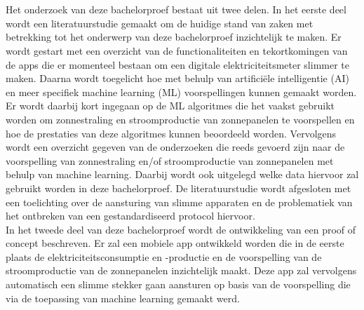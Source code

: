
\chapter{}%
\label{ch:methodologie}


Het onderzoek van deze bachelorproef bestaat uit twee delen. In het eerste deel wordt een literatuurstudie gemaakt om de huidige stand van zaken met betrekking tot het onderwerp van deze bachelorproef inzichtelijk te maken. Er wordt gestart met een overzicht van de functionaliteiten en tekortkomingen van de apps die er momenteel bestaan om een digitale elektriciteitsmeter slimmer te maken. Daarna wordt toegelicht hoe met behulp van artificiële intelligentie (AI) en meer specifiek machine learning (ML) voorspellingen kunnen gemaakt worden. Er wordt daarbij kort ingegaan op de ML algoritmes die het vaakst gebruikt worden om zonnestraling en stroomproductie van zonnepanelen te voorspellen en hoe de prestaties van deze algoritmes kunnen beoordeeld worden. Vervolgens wordt een overzicht gegeven van de onderzoeken die reeds gevoerd zijn naar de voorspelling van zonnestraling en/of stroomproductie van zonnepanelen met behulp van machine learning. Daarbij wordt ook uitgelegd welke data hiervoor zal gebruikt worden in deze bachelorproef. De literatuurstudie wordt afgesloten met een toelichting over de aansturing van slimme apparaten en de problematiek van het ontbreken van een gestandardiseerd protocol hiervoor. \\

In het tweede deel van deze bachelorproef wordt de ontwikkeling van een proof of concept beschreven. Er zal een mobiele app ontwikkeld worden die in de eerste plaats de elektriciteitsconsumptie en -productie en de voorspelling van de stroomproductie van de zonnepanelen inzichtelijk maakt. Deze app zal vervolgens automatisch een slimme stekker gaan aansturen op basis van de voorspelling die via de toepassing van machine learning gemaakt werd.


